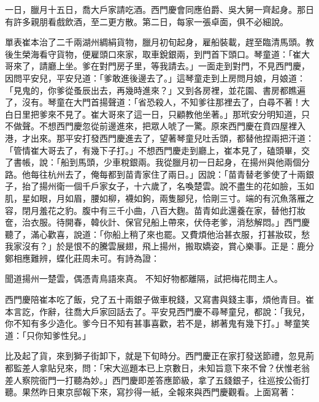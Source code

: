 \begin{showcontents}{}
一日，臘月十五日，喬大戶家請吃酒。西門慶會同應伯爵、吳大舅一齊起身。那日有許多親朋看戲飲酒，至二更方散。第二日，每家一張卓面，俱不必細說。

單表崔本治了二千兩湖州綢絹貨物，臘月初旬起身，雇船裝載，趕至臨清馬頭。教後生榮海看守貨物，便雇頭口來家，取車銳銀兩，到門首下頭口。琴童道：「崔大哥來了，請廳上坐。爹在對門房子里，等我請去。」一面走到對門，不見西門慶，因問平安兒，平安兒道：「爹敢進後邊去了。」這琴童走到上房問月娘，月娘道： 「見鬼的，你爹從蚤辰出去，再幾時進來？」又到各房裡，並花園、書房都瞧遍了，沒有。琴童在大門首揚聲道：「省恐殺人，不知爹往那裡去了，白尋不著！大白日里把爹來不見了。崔大哥來了這一日，只顧教他坐著。」那玳安分明知道，只不做聲。不想西門慶忽從前邊進來，把眾人唬了一驚。原來西門慶在賁四屋裡入港，才出來。那平安打發西門慶進去了，望著琴童兒吐舌頭，都替他捏兩把汗道：「管情崔大哥去了，有幾下子打。」不想西門慶走到廳上，崔本見了，磕頭畢，交了書帳，說：「船到馬頭，少車稅銀兩。我從臘月初一日起身，在揚州與他兩個分路。他每往杭州去了，俺每都到苗青家住了兩日。」因說：「苗青替老爹使了十兩銀子，抬了揚州衛一個千戶家女子，十六歲了，名喚楚雲。說不盡生的花如臉，玉如肌，星如眼，月如眉，腰如柳，襪如鉤，兩隻腳兒，恰剛三寸。端的有沉魚落雁之容，閉月羞花之豹。腹中有三千小曲，八百大麴。苗青如此還養在家，替他打妝奩，治衣服。待開春，韓伙計、保官兒船上帶來，伏侍老爹，消愁解悶。」西門慶聽了，滿心歡喜，說道：「你船上稍了來也罷。又費煩他治甚衣服，打甚妝砹，愁我家沒有？」於是恨不的騰雲展翅，飛上揚州，搬取嬌姿，賞心樂事。正是：鹿分鄭相應難辨，蝶化莊周未可。有詩為證：

聞道揚州一楚雲，偶憑青鳥語來真。
不知好物都離隔，試把梅花問主人。

西門慶陪崔本吃了飯，兌了五十兩銀子做車稅錢，又寫書與錢主事，煩他青目。崔本言訖，作辭，往喬大戶家回話去了。平安見西門慶不尋琴童兒，都說：「我兒，你不知有多少造化。爹今日不知有甚事喜歡，若不是，綁著鬼有幾下打。」琴童笑道：「只你知爹性兒。」

比及起了貨，來到獅子街卸下，就是下旬時分。西門慶正在家打發送節禮，忽見荊都監差人拿貼兒來，問：「宋大巡題本已上京數日，未知旨意下來不曾？伏惟老翁差人察院衙門一打聽為妙。」西門慶即差答應節級，拿了五錢銀子，往巡按公衙打聽。果然昨日東京邸報下來，寫抄得一紙，全報來與西門慶觀看。上面寫著：


\end{showcontents}
